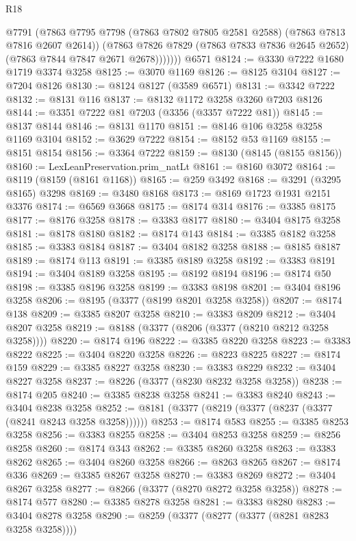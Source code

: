 \begin{lexlean}{R18}
\begin{coremodule}
              @7791
              (@7863 @7795 @7798 (@7863 @7802 @7805 @2581 @2588) (@7863 @7813 @7816 @2607 @2614))
              (@7863
                @7826
                @7829
                (@7863 @7833 @7836 @2645 @2652)
                (@7863 @7844 @7847 @2671 @2678)))))))
    @6571
@8124 := @3330 @7222 @1680 @1719 @3374 @3258
@8125 := @3070 @1169
@8126 := @8125 @3104
@8127 := @7204 @8126
@8130 := @8124 @8127 (@3589 @6571)
@8131 := @3342 @7222
@8132 := @8131 @116
@8137 := @8132 @1172 @3258 @3260 @7203 @8126
@8144 := @3351 @7222 @81 @7203 (@3356 (@3357 @7222 @81))
@8145 := @8137 @8144
@8146 := @8131 @1170
@8151 := @8146 @106 @3258 @3258 @1169 @3104
@8152 := @3629 @7222
@8154 := @8152 @53 @1169
@8155 := @8151 @8154
@8156 := @3364 @7222
@8159 := @8130 (@8145 (@8155 @8156))
@8160 := LexLeanPreservation.prim_natLt
@8161 := @8160 @3072
@8164 := @8119 (@8159 (@8161 @1168))
@8165 := @259 @3492
@8168 := @3291 (@3295 @8165) @3298
@8169 := @3480 @8168
@8173 := @8169 @1723 @1931 @2151 @3376
@8174 := @6569 @3668
@8175 := @8174 @314
@8176 := @3385 @8175
@8177 := @8176 @3258
@8178 := @3383 @8177
@8180 := @3404 @8175 @3258
@8181 := @8178 @8180
@8182 := @8174 @143
@8184 := @3385 @8182 @3258
@8185 := @3383 @8184
@8187 := @3404 @8182 @3258
@8188 := @8185 @8187
@8189 := @8174 @113
@8191 := @3385 @8189 @3258
@8192 := @3383 @8191
@8194 := @3404 @8189 @3258
@8195 := @8192 @8194
@8196 := @8174 @50
@8198 := @3385 @8196 @3258
@8199 := @3383 @8198
@8201 := @3404 @8196 @3258
@8206 := @8195 (@3377 (@8199 @8201 @3258 @3258))
@8207 := @8174 @138
@8209 := @3385 @8207 @3258
@8210 := @3383 @8209
@8212 := @3404 @8207 @3258
@8219 := @8188 (@3377 (@8206 (@3377 (@8210 @8212 @3258 @3258))))
@8220 := @8174 @196
@8222 := @3385 @8220 @3258
@8223 := @3383 @8222
@8225 := @3404 @8220 @3258
@8226 := @8223 @8225
@8227 := @8174 @159
@8229 := @3385 @8227 @3258
@8230 := @3383 @8229
@8232 := @3404 @8227 @3258
@8237 := @8226 (@3377 (@8230 @8232 @3258 @3258))
@8238 := @8174 @205
@8240 := @3385 @8238 @3258
@8241 := @3383 @8240
@8243 := @3404 @8238 @3258
@8252 := @8181 (@3377 (@8219 (@3377 (@8237 (@3377 (@8241 @8243 @3258 @3258))))))
@8253 := @8174 @583
@8255 := @3385 @8253 @3258
@8256 := @3383 @8255
@8258 := @3404 @8253 @3258
@8259 := @8256 @8258
@8260 := @8174 @343
@8262 := @3385 @8260 @3258
@8263 := @3383 @8262
@8265 := @3404 @8260 @3258
@8266 := @8263 @8265
@8267 := @8174 @336
@8269 := @3385 @8267 @3258
@8270 := @3383 @8269
@8272 := @3404 @8267 @3258
@8277 := @8266 (@3377 (@8270 @8272 @3258 @3258))
@8278 := @8174 @577
@8280 := @3385 @8278 @3258
@8281 := @3383 @8280
@8283 := @3404 @8278 @3258
@8290 := @8259 (@3377 (@8277 (@3377 (@8281 @8283 @3258 @3258))))

\end{coremodule}
\end{lexlean}
